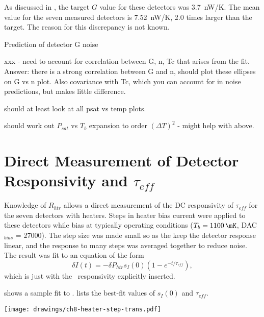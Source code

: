 As discussed in , the target $G$ value for these detectors was 3.7~nW/K.
The mean value for the seven measured detectors is 7.52~nW/K, 2.0 times larger than the target.
The reason for this discrepancy is not known.

Prediction of detector G noise

xxx - need to account for correlation between G, n, Tc that arises from the fit.
Answer: there is a strong correlation between G and n, should plot these ellipses on G vs n plot. Also covariance with Tc, which you can account for in noise predictions, but makes little difference.

should at least look at all psat vs temp plots.

should work out $P_{sat}$ vs $T_b$ expansion to order $(\Delta T)^2$ - might help with above.

\section{Direct Measurement of Detector Responsivity and $\tau_{eff}$}

Knowledge of $R_{htr}$ allows a direct measurement of the DC responsivity of $\tau_{eff}$ for the seven detectors with heaters.
Steps in heater bias current were applied to these detectors while bias at typically operating conditions ($T_b = \SI{1100}{\mK}$, DAC$_{bias}$ = 27000).
The step size was made small so as the keep the detector response linear, and the response to many steps was averaged together to reduce noise.
The result was fit to an equation of the form
\begin{equation} \label{eqn:ch8-heater-step-trans}
  \delta I(t) = - \delta P_{htr} s_I(0) (1 - e^{-t/\tau_{eff}}),
\end{equation}
which is just  with the \DC\ responsivity explicitly inserted.

 shows a sample fit to .
 lists the best-fit values of $s_I(0)$ and $\tau_{eff}$.

\begin{figure*}
\centering
\texttt{[image: drawings/ch8-heater-step-trans.pdf]}
\caption{Plot showing response of detector  to step in applied heater power of \SI{1.41}{\pico\watt}.
Plots are for  biased into normal operating conditions.
Data acquired at \SI{3125}{\Hz}.
Data averaged over 32 steps (16 up and 16 down) along with best fit to .
The step in applied power begins at $t \approx \SI{0.6}{\ms}$, not $t = \SI{0}{\ms}$.
} 
\label{fig:ch8-heater-step-trans}
\end{figure*}

